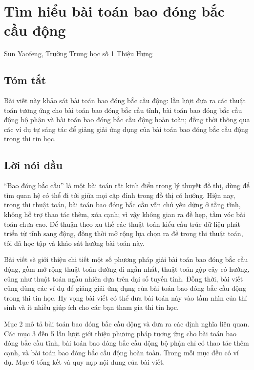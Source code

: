 \documentclass[11pt]{article}
\begin{document}
\section{Tìm hiểu bài toán bao đóng bắc cầu động}

\begin{center}
Sun Yaofeng, Trường Trung học số 1 Thiệu Hưng
\end{center}

\subsection*{Tóm tắt}

Bài viết này khảo sát bài toán bao đóng bắc cầu động: lần lượt đưa ra các
thuật toán tương ứng cho bài toán bao đóng bắc cầu tĩnh, bài toán bao đóng bắc
cầu động bộ phận và bài toán bao đóng bắc cầu động hoàn toàn; đồng thời thông
qua các ví dụ tự sáng tác để giảng giải ứng dụng của bài toán bao đóng bắc cầu
động trong thi tin học.

\subsection{Lời nói đầu}

``Bao đóng bắc cầu'' là một bài toán rất kinh điển trong lý thuyết đồ thị, dùng
để tìm quan hệ có thể đi tới giữa mọi cặp đỉnh trong đồ thị có hướng. Hiện nay,
trong thi thuật toán, bài toán bao đóng bắc cầu vẫn chủ yếu dừng ở tầng tĩnh,
không hỗ trợ thao tác thêm, xóa cạnh; vì vậy không gian ra đề hẹp, tầm vóc bài
toán chưa cao. Để thuận theo xu thế các thuật toán kiểu cấu trúc dữ liệu phát
triển từ tĩnh sang động, đồng thời mở rộng lựa chọn ra đề trong thi thuật toán,
tôi đã học tập và khảo sát hướng bài toán này.

Bài viết sẽ giới thiệu chi tiết một số phương pháp giải bài toán bao đóng bắc
cầu động, gồm mở rộng thuật toán đường đi ngắn nhất, thuật toán gộp cây có
hướng, cũng như thuật toán ngẫu nhiên dựa trên đại số tuyến tính. Đồng thời,
bài viết cũng dùng các ví dụ để giảng giải ứng dụng của bài toán bao đóng bắc
cầu động trong thi tin học. Hy vọng bài viết có thể đưa bài toán này vào tầm
nhìn của thí sinh và ít nhiều giúp ích cho các bạn tham gia thi tin học.

Mục 2 mô tả bài toán bao đóng bắc cầu động và đưa ra các định nghĩa liên quan.
Các mục 3 đến 5 lần lượt giới thiệu phương pháp tương ứng cho bài toán bao
đóng bắc cầu tĩnh, bài toán bao đóng bắc cầu động bộ phận chỉ có thao tác thêm
cạnh, và bài toán bao đóng bắc cầu động hoàn toàn. Trong mỗi mục đều có ví dụ.
Mục 6 tổng kết và quy nạp nội dung của bài viết.
\end{document}
